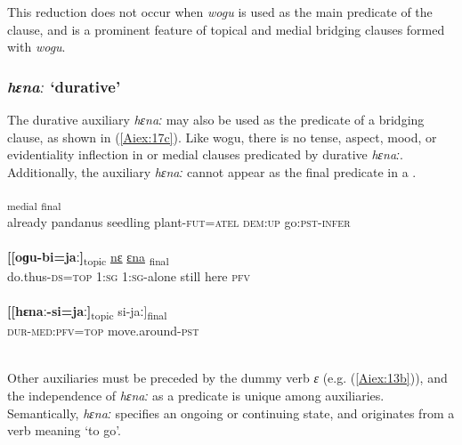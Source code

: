 \documentclass[output=paper]{LSP/langsci}
\begin{document}
This reduction does not occur when \textit{wogu} is used as the main predicate of the clause, and is a prominent feature of topical and medial bridging clauses formed with \textit{wogu}.


\subsubsection{\textit{hɛnaː} `durative'} 
\label{Aiaspect.hena}
The durative auxiliary \textit{hɛnaː} may also be used as the predicate of a bridging clause, as shown in (\ref{Aiex:17c}). Like wogu, there is no tense, aspect, mood, or evidentiality inflection in  or medial clauses predicated by durative \textit{hɛnaː}. Additionally, the auxiliary \textit{hɛnaː} cannot appear as the final predicate in a . 

\begin{exe}
\ex \label{Aiex:17ac}
\begin{xlist}
\ex \label{Aiex:17a}
\gll	[ɛimɛ	oɡa	ɛ	ɡɛ-mɛna=ta]\textsubscript{medial}	\underline{\smash{[holo}}	\underline{\smash{anɛ-obo]}}\textsubscript{final}\\
already	pandanus	seedling	plant-\textsc{fut=atel}	\textsc{dem:up}	go:\textsc{pst-infer}\\
\glt ‎\\
\ex \label{Aiex:17b}
\gll	\textbf{[[oɡu-bi=jaː]}\textsubscript{topic}	\underline{nɛ}	\underline{}	\underline{ɛna}	\underline{}	\underline{\smash{di]}}\textsubscript{final}\\
do.thus\textsc{-ds=top}	\textsc{1:sg}	\textsc{1:sg-}alone	still	here	\textsc{pfv}\\
\glt {}\\
\ex \label{Aiex:17c}
\gll	\textbf{[[hɛnaː-si=jaː]}\textsubscript{topic}	si-jaː]\textsubscript{final}\\
\textsc{dur-med:pfv=top}	move.around\textsc{-pst}\\
\glt	{}\\
\end{xlist}
\end{exe}


Other auxiliaries must be preceded by the dummy verb \textit{ɛ} (e.g. (\ref{Aiex:13b})), and the independence of \textit{hɛnaː} as a predicate is unique among auxiliaries. Semantically, \textit{hɛnaː} specifies an ongoing  or continuing state, and originates from a verb meaning `to go'.
\end{document}
